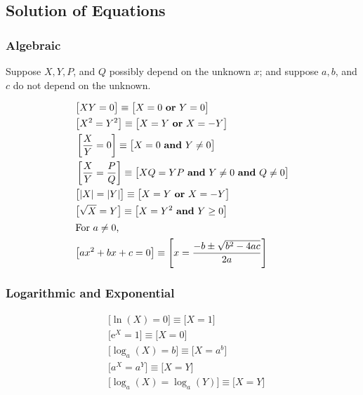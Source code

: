 \documentclass[letterpaper,landscape,9pt,fleqn]{extarticle}
\newcommand{\euler}{\mathrm{e}}
\begin{document}
\begin{multicols*}{3}
\section*{Solution of Equations}

\subsubsection*{Algebraic}
Suppose $X, Y, P$, and $Q$ possibly  depend on the unknown $x$; and
suppose $a,b$, and $c$ do not depend on the unknown. 
\begin{minipage}[c]{0.3333333333333\textwidth}
\begin{align*}
& \big [X Y = 0 \big ] \equiv \big [ X = 0 \mbox{ \textbf{or} } Y = 0 \big ]\\
& \big [ X^2 = Y^2 \big ] \equiv \big [ X = Y \mbox{ \textbf{or} } X = -Y \big ]\\
&\left [ \frac{X}{Y} = 0 \right ] \equiv \big [ X = 0 \mbox{ \textbf{and} } Y \neq 0 \big ] \\
&\left [\frac{X}{Y} = \frac{P}{Q}  \right ] \equiv \big [X Q = Y P  \mbox{ \textbf{and}  } Y \neq 0  \mbox{ \textbf{and}  }  Q \neq 0 \big ] \\
&\big [|X| = |Y|  \big ] \equiv \big [X = Y \mbox{ \textbf{or} } X = -Y \big ]\\
&\big [ \sqrt{X}  = Y \big ] \equiv \big [X = Y^2 \mbox{ \textbf{and}  } Y \ge 0 \big ] \\
\intertext{For \(a \neq 0\),}
& \big [a x^2 + b x + c = 0 \big] \equiv \left [x = \frac{-b \pm \sqrt{b^2 - 4 a c}}{2 a} \right] \\
\end{align*}
\end{minipage}
\begin{minipage}[c]{0.3333333333333\textwidth}
\subsubsection*{Logarithmic and Exponential}
\begin{align*}
& \big [\ln(X) = 0 \big] \equiv \big [X =  1\big] \\
& \big [\euler^X = 1 \big] \equiv \big [X = 0 \big] \\
& \big [\log_a(X) = b \big] \equiv \big [X = a^b \big] \\
& \big [a^X = a^Y \big] \equiv \big [X = Y \big] \\
& \big [\log_a(X) = \log_a(Y) \big] \equiv \big [X = Y \big] 
\end{align*}
\end{minipage}

\end{multicols*}
\end{document}
